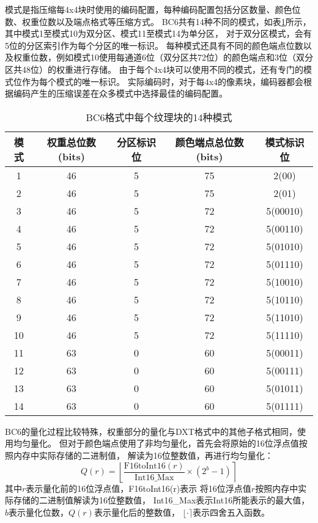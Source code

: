 模式是指压缩每4x4块时使用的编码配置，每种编码配置包括分区数量、颜色位数、权重位数以及端点格式等压缩方式。
BC6共有14种不同的模式，如表\ref{tab:BC6Mode}所示，其中模式1至模式10为双分区、模式11至模式14为单分区，
对于双分区模式，会有5位的分区索引作为每个分区的唯一标识。
每种模式还具有不同的颜色端点位数以及权重位数，例如模式10使用每通道6位（双分区共72位）的颜色端点和3位（双分区共48位）的权重进行存储。
由于每个4x4块可以使用不同的模式，还有专门的模式位作为每个模式的唯一标识。
实际编码时，对于每4x4的像素块，编码器都会根据编码产生的压缩误差在众多模式中选择最佳的编码配置。

\begin{table}[htbp]
    \centering
    \caption{BC6格式中每个纹理块的14种模式\cite{BC6H}}
    \label{tab:BC6Mode}        
    \begin{tabular}{ccccc}
    \toprule
    模式 & 权重总位数(bits) & 分区标识位 & 颜色端点总位数(bits) & 模式标识位\\
    \midrule
    1   &   46    &  5  &   75  &   2(00)   \\
    2   &   46    &  5  &   75  &   2(01)   \\
    3   &   46    &  5  &   72  &   5(00010)   \\
    4   &   46    &  5  &   72  &   5(00110)   \\
    5   &   46    &  5  &   72  &   5(01010)   \\
    6   &   46    &  5  &   72  &   5(01110)   \\
    7   &   46    &  5  &   72  &   5(10010)   \\
    8   &   46    &  5  &   72  &   5(10110)   \\
    9   &   46    &  5  &   72  &   5(11010)   \\
    10  &   46    &  5  &   72  &   5(11110)   \\
    11  &   63    &  0  &   60  &   5(00011)   \\
    12  &   63    &  0  &   60  &   5(00111)   \\
    13  &   63    &  0  &   60  &   5(01011)   \\
    14  &   63    &  0  &   60  &   5(01111)   \\
    \bottomrule
    \end{tabular}
\end{table}

BC6的量化过程比较特殊，权重部分的量化与DXT格式中的其他子格式相同，使用均匀量化。
但对于颜色端点使用了非均匀量化，首先会将原始的16位浮点值按照内存中实际存储的二进制值，
解读为16位整数值，再进行均匀量化：
\begin{equation}
    Q(r)=\left \lfloor \frac{\text{F16toInt16}(r)}{\text{Int16\_Max}} \times (2^{b}-1) \right \rceil
\end{equation}
其中$r$表示量化前的16位浮点值，F16toInt16(r)表示
将16位浮点值$r$按照内存中实际存储的二进制值解读为16位整数值，
Int16\_Max表示Int16所能表示的最大值，
$b$表示量化位数，$Q(r)$表示量化后的整数值，
$\lfloor \cdot \rceil$表示四舍五入函数。

